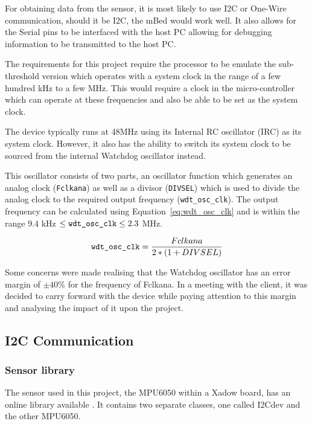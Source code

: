 For obtaining data from the sensor, it is most likely to use I2C or One-Wire communication, should it be I2C, the mBed would work well. It also allows for the Serial pins to be interfaced with the host PC allowing for debugging information to be transmitted to the host PC. 

The requirements for this project require the processor to be emulate the sub-threshold version which operates with a system clock in the range of a few hundred kHz to a few MHz. This would require a clock in the micro-controller which can operate at these frequencies and also be able to be set as the system clock.

The device typically runs at 48MHz using its Internal RC oscillator (IRC) as its system clock. However, it also has the ability to switch its system clock to be sourced from the internal Watchdog oscillator instead. 

This oscillator consists of two parts, an oscillator function which generates an analog clock (\verb|Fclkana|) as well as a divisor (\verb|DIVSEL|) which is used to divide the analog clock to the required output frequency (\verb|wdt_osc_clk|). The output frequency can be calculated using Equation~\ref{eq:wdt_osc_clk} and is within the range $ 9.4 $ kHz $ \leq \verb|wdt_osc_clk| \leq 2.3 $ MHz. \cite{mbed_datasheet}

\begin{equation}
	\label{eq:wdt_osc_clk}
	\verb|wdt_osc_clk| = \frac{Fclkana}{2 * (1 + DIVSEL)}
\end{equation}

Some concerns were made realising that the Watchdog oscillator has an error margin of $\pm 40\%$ for the frequency of Fclkana. In a meeting with the client, it was decided to carry forward with the device while paying attention to this margin and analysing the impact of it upon the project.

\subsection{I2C Communication}

\subsubsection{Sensor library}

The sensor used in this project, the MPU6050 within a Xadow board, has an online library available \cite{sensory_library}. It contains two separate classes, one called I2Cdev and the other MPU6050. 

